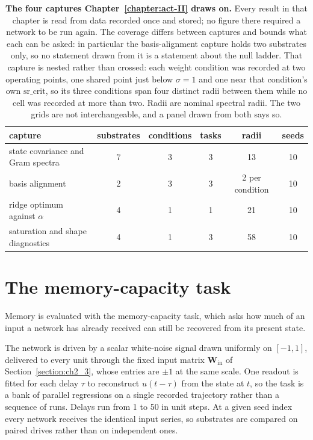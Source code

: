 \begin{table}[ht]
    \centering
    \caption[The captures Chapter 5 draws on]{\textbf{The four captures
    Chapter~\ref{chapter:act-II} draws on.} Every result in that chapter is read
    from data recorded once and stored; no figure there required a network to be
    run again. The coverage differs between captures and bounds what each can be
    asked: in particular the basis-alignment capture holds two substrates only,
    so no statement drawn from it is a statement about the null ladder. 
    That capture is nested rather than crossed: each weight condition was
    recorded at two operating points, one shared point just below
    $\sigma = 1$ and one near that condition's own
    $\mathrm{sr\_crit}$, %
    so its three conditions span four distinct radii between them while no cell
    was recorded at more than two. Radii are
    nominal spectral radii. The two grids are not interchangeable, and a panel
    drawn from both says so.}
    \label{tab:methods-captures}
    \begin{tabular}{lccccc}
        \toprule
        capture & substrates & conditions & tasks & radii & seeds \\
        \midrule
        state covariance and Gram spectra & 7 & 3 & 3 & 13 & 10 \\ %
        basis alignment & 2 & 3 & 3 & 2 per condition & 10 \\ %
        ridge optimum against $\alpha$ & 4 & 1 & 1 & 21 & 10 \\ %
        saturation and shape diagnostics & 4 & 1 & 3 & 58 & 10 \\ %
        \bottomrule
    \end{tabular}
\end{table}



\section{The memory-capacity task}
\label{sec:methods-memory-capacity}
\bigskip

Memory is evaluated with the memory-capacity task, which asks how much of an
input a network has already received can still be recovered from its present
state.

The network is driven by a scalar white-noise signal drawn uniformly on
$[-1, 1]$, delivered to every unit through the fixed input matrix
$\mathbf{W}_{\!\mathrm{in}}$ of Section~\ref{section:ch2_3}, whose entries are
$\pm 1$ at the same scale. One readout is fitted for each delay $\tau$ to
reconstruct $u(t - \tau)$ from the state at $t$, so the task is a bank of
parallel regressions on a single recorded trajectory rather than a sequence of
runs. Delays run from
1 to 50 in unit steps. %
At a given seed index every network receives the identical input series, so
substrates are compared on paired drives rather than on independent ones.

